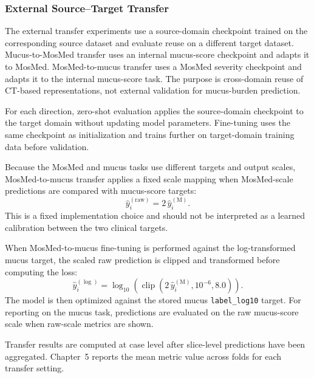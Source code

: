 \subsubsection{External Source--Target Transfer}
\label{sec:external_source_target_transfer}
The external transfer experiments use a source-domain checkpoint trained on the corresponding source dataset and evaluate reuse on a different target dataset. Mucus-to-MosMed transfer uses an internal mucus-score checkpoint and adapts it to MosMed. MosMed-to-mucus transfer uses a MosMed severity checkpoint and adapts it to the internal mucus-score task. The purpose is cross-domain reuse of CT-based representations, not external validation for mucus-burden prediction.

For each direction, zero-shot evaluation applies the source-domain checkpoint to the target domain without updating model parameters. Fine-tuning uses the same checkpoint as initialization and trains further on target-domain training data before validation.

Because the MosMed and mucus tasks use different targets and output scales, MosMed-to-mucus transfer applies a fixed scale mapping when MosMed-scale predictions are compared with mucus-score targets:
\[
\hat{y}_{i}^{(\mathrm{raw})}
=
2\,\hat{y}_{i}^{(\mathrm{M})}.
\]
This is a fixed implementation choice and should not be interpreted as a learned calibration between the two clinical targets.

When MosMed-to-mucus fine-tuning is performed against the log-transformed mucus target, the scaled raw prediction is clipped and transformed before computing the loss:
\[
\hat{y}_{i}^{(\log)}
=
\log_{10}
\left(
\operatorname{clip}
\left(
2\,\hat{y}_{i}^{(\mathrm{M})},
10^{-6},
8.0
\right)
\right).
\]
The model is then optimized against the stored mucus \texttt{label\_log10} target. For reporting on the mucus task, predictions are evaluated on the raw mucus-score scale when raw-scale metrics are shown.

Transfer results are computed at case level after slice-level predictions have been aggregated. Chapter~5 reports the mean metric value across folds for each transfer setting.



